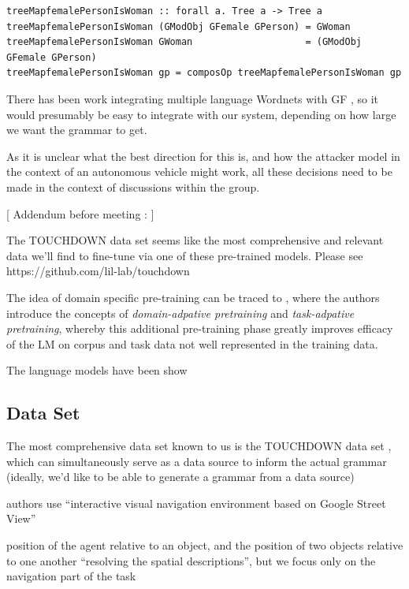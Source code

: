 \documentclass[a4paper, 11pt]{article}
\begin{document}
\begin{verbatim}
treeMapfemalePersonIsWoman :: forall a. Tree a -> Tree a
treeMapfemalePersonIsWoman (GModObj GFemale GPerson) = GWoman
treeMapfemalePersonIsWoman GWoman                    = (GModObj GFemale GPerson)
treeMapfemalePersonIsWoman gp = composOp treeMapfemalePersonIsWoman gp
\end{verbatim}

There has been work integrating multiple language Wordnets with GF
\cite{virk2014developing}, so it would presumably be easy to integrate with our
system, depending on how large we want the grammar to get.


As it is unclear what the best direction for this is, and how the attacker model
in the context of an autonomous vehicle might work, all these decisions need to
be made in the context of discussions within the group.

[ Addendum before meeting : ]

The TOUCHDOWN data set \cite{chen2019touchdown} seems like the most
comprehensive and relevant data we'll find to fine-tune via one of these
pre-trained models. Please see https://github.com/lil-lab/touchdown


The idea of domain specific pre-training can be traced to
\cite{gururangan-etal-2020-dont}, where the authors introduce the concepts of
\emph{domain-adpative pretraining} and \emph{task-adpative pretraining}, whereby
this additional pre-training phase greatly improves efficacy of the LM on
corpus and task data not well represented in the training data.

The language models have been show \cite{bioBert}

\subsection{Data Set}

The most comprehensive data set known to us is the TOUCHDOWN data set
\cite{chen2019touchdown}, which can simultaneously serve as a data source to
inform the actual grammar (ideally, we'd like to be able to generate a grammar
from a data source)

authors use ``interactive visual navigation environment based on Google Street
View''

position of the agent relative to an object, and the position of two objects
relative to one another
``resolving the spatial descriptions'', but we focus only on the navigation part
of the task
\end{document}
